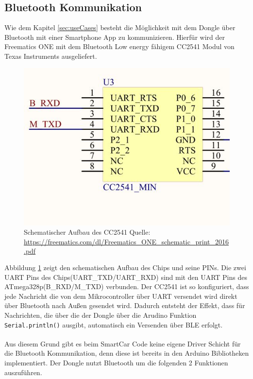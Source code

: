 \subsection{Bluetooth Kommunikation}
\label{sec:Bluetooth}
Wie dem Kapitel \ref{sec:useCases} besteht die Möglichkeit mit dem Dongle über Bluetooth mit einer Smartphone App zu kommunizieren. Hierfür wird der Freematics ONE mit dem Bluetooth Low energy fähigem CC2541 Modul von Texas Instruments ausgeliefert.
\begin{figure}[h]
  \begin{center}
    \includegraphics[scale=0.5]{./img/BLEChip.jpg}
    \caption{Schematischer Aufbau des CC2541 Quelle: \url{https://freematics.com/dl/Freematics_ONE_schematic_print_2016.pdf}}
    \label{fig:BLEChip}
  \end{center}
\end{figure} 
Abbildung \ref{fig:BLEChip} zeigt den schematischen Aufbau des Chips und seine PINs. Die zwei UART Pins des Chips(UART\_TXD/UART\_RXD) sind mit den UART Pins des ATmega328p(B\_RXD/M\_TXD) verbunden. Der CC2541 ist so konfiguriert, dass jede Nachricht die von dem Mikrocontroller über UART versendet wird direkt über Bluetooth nach Außen gesendet wird. Dadurch entsteht der Effekt, dass für Nachrichten, die über die der Dongle über die Arudino Funktion \texttt{Serial.println()} ausgibt, automatisch ein Versenden über BLE erfolgt.
\paragraph{}{}
Aus diesem Grund gibt es beim SmartCar Code keine eigene Driver Schicht für die Bluetooth Kommunikation, denn diese ist bereits in den Arduino Bibliotheken implementiert. Der Dongle nutzt Bluetooth um die folgenden 2 Funktionen auszuführen.
